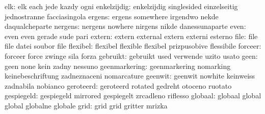                       elk: elk                       each
                           jede                      kazdy
                           ogni
              enkelzijdig: enkelzijdig               singlesided
                           einzelseitig              jednostranne
                           facciasingola
                   ergens: ergens                    somewhere
                           irgendwo                  nekde
                           daqualcheparte
                  nergens: nergens                   nowhere
                           nirgens                   nikde
                           danessunaparte
                     even: even                      even
                           gerade                    sude
                           pari
                   extern: extern                    external
                           extern                    externi
                           esterno
                     file: file                      file
                           datei                     soubor
                           file
                 flexibel: flexibel                  flexible
                           flexibel                  prizpusobive
                           flessibile
                  forceer: forceer                   force
                           zwinge                    sila
                           forza
                 gebruikt: gebruikt                  used
                           verwende                  uzito
                           usato
                     geen: geen                      none
                           kein                      zadny
                           nessuno
            geenmarkering: geenmarkering             nomarking
                           keinebeschriftung         zadneznaceni
                           nomarcature
                  geenwit: geenwit                   nowhite
                           keinweiss                 zadnabila
                           nobianco
                geroteerd: geroteerd                 rotated
                           gedreht                   otoceno
                           ruotato
               gespiegeld: gespiegeld                mirrored
                           gespiegelt                zrcadleno
                           riflesso
                  globaal: globaal                   global
                           global                    globalne
                           globale
                     grid: grid                      grid
                           gritter                   mrizka
